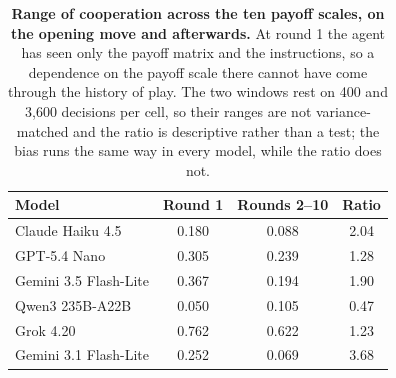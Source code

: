 \documentclass[11pt,a4paper]{article}
\begin{document}
\begin{table}[htbp]
\centering
\footnotesize
\setlength{\tabcolsep}{4pt}
\caption{\textbf{Pairwise correlation between the model curves, all six models.} The same correlations with the sixth model included: nine of the fifteen pairs are negative and the mean is $-0.08$.}
\label{tab:S-shapes-all}
\end{table}

\begin{table}[htbp]
\centering
\footnotesize
\setlength{\tabcolsep}{4pt}
\caption{\textbf{Range of cooperation across the ten payoff scales, on the opening move and afterwards.} At round 1 the agent has seen only the payoff matrix and the instructions, so a dependence on the payoff scale there cannot have come through the history of play. The two windows rest on 400 and 3{,}600 decisions per cell, so their ranges are not variance-matched and the ratio is descriptive rather than a test; the bias runs the same way in every model, while the ratio does not.}
\label{tab:S-firstmove}
\begin{tabular}{@{}lccc@{}}
\toprule
Model & Round 1 & Rounds 2--10 & Ratio \\
\midrule
Claude Haiku 4.5 & 0.180 & 0.088 & 2.04 \\
GPT-5.4 Nano & 0.305 & 0.239 & 1.28 \\
Gemini 3.5 Flash-Lite & 0.367 & 0.194 & 1.90 \\
Qwen3 235B-A22B & 0.050 & 0.105 & 0.47 \\
Grok 4.20 & 0.762 & 0.622 & 1.23 \\
Gemini 3.1 Flash-Lite & 0.252 & 0.069 & 3.68 \\
\bottomrule
\end{tabular}
\end{table}
\end{document}
